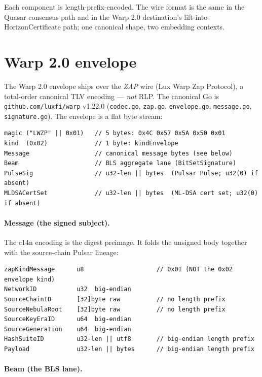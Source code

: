\documentclass[11pt,a4paper]{article}
\begin{document}
Each component is length-prefix-encoded. The wire format is the same in the Quasar consensus path and in the Warp 2.0 destination's lift-into-HorizonCertificate path; one canonical shape, two embedding contexts.

\section{Warp 2.0 envelope}
\label{sec:warp-envelope}

The Warp 2.0 envelope ships over the \emph{ZAP} wire (Lux Warp Zap Protocol), a total-order canonical TLV encoding --- \emph{not} RLP. The canonical Go is \texttt{github.com/luxfi/warp} v1.22.0 (\texttt{codec.go}, \texttt{zap.go}, \texttt{envelope.go}, \texttt{message.go}, \texttt{signature.go}). The envelope is a flat byte stream:

\begin{lstlisting}
magic ("LWZP" || 0x01)   // 5 bytes: 0x4C 0x57 0x5A 0x50 0x01
kind  (0x02)             // 1 byte: kindEnvelope
Message                  // canonical message bytes (see below)
Beam                     // BLS aggregate lane (BitSetSignature)
PulseSig                 // u32-len || bytes  (Pulsar Pulse; u32(0) if absent)
MLDSACertSet             // u32-len || bytes  (ML-DSA cert set; u32(0) if absent)
\end{lstlisting}

\paragraph{Message (the signed subject).} The c14n encoding is the digest preimage. It folds the unsigned body together with the source-chain Pulsar lineage:

\begin{lstlisting}
zapKindMessage      u8                    // 0x01 (NOT the 0x02 envelope kind)
NetworkID           u32  big-endian
SourceChainID       [32]byte raw          // no length prefix
SourceNebulaRoot    [32]byte raw          // no length prefix
SourceKeyEraID      u64  big-endian
SourceGeneration    u64  big-endian
HashSuiteID         u32-len || utf8       // big-endian length prefix
Payload             u32-len || bytes      // big-endian length prefix
\end{lstlisting}

\paragraph{Beam (the BLS lane).}
\end{document}
